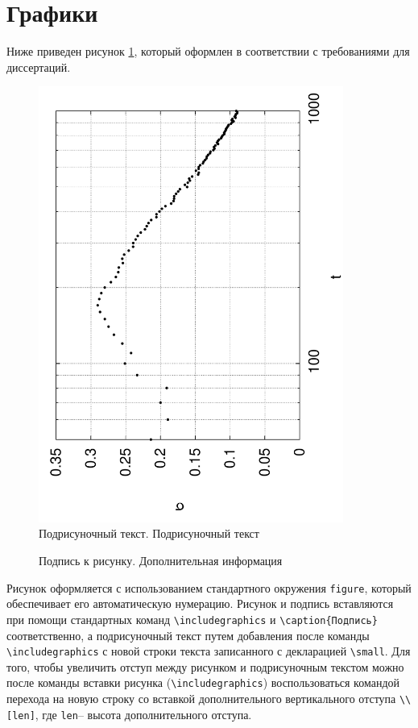\section{Графики}

Ниже приведен рисунок \ref{fig}, который оформлен в соответствии с требованиями
для диссертаций.

\begin{figure}[h!]
\begin{center}
\includegraphics[angle=270,width=10cm]{test}\\[2mm]
{\small Подрисуночный текст. Подрисуночный текст}
\caption{Подпись к рисунку. Дополнительная информация}\label{fig}
\end{center}
\end{figure}

Рисунок оформляется с использованием стандартного окружения \verb|figure|,
который обеспечивает его автоматическую нумерацию. Рисунок и подпись вставляются
при помощи стандартных команд \verb|\includegraphics| и
\verb|\caption{Подпись}| соответственно, а подрисуночный текст путем добавления
после команды \verb|\includegraphics| с новой строки текста записанного с декларацией \verb|\small|. Для
того, чтобы увеличить отступ между рисунком и подрисуночным текстом можно после
команды вставки рисунка (\verb|\includegraphics|) воспользоваться командой
перехода на новую строку со вставкой дополнительного вертикального отступа
\verb|\\[len]|, где \verb|len|--  высота дополнительного отступа.



